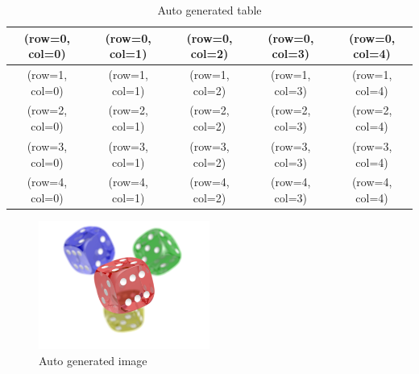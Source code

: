 \documentclass[a4paper,11pt]{article}
\begin{document}
\begin{table}
\caption{Auto generated table}
\centering
\begin{tabular}{|c|c|c|c|c|}

\hline
(row=0, col=0) & (row=0, col=1) & (row=0, col=2) & (row=0, col=3) & (row=0, col=4) \\
\hline
(row=1, col=0) & (row=1, col=1) & (row=1, col=2) & (row=1, col=3) & (row=1, col=4) \\
\hline
(row=2, col=0) & (row=2, col=1) & (row=2, col=2) & (row=2, col=3) & (row=2, col=4) \\
\hline
(row=3, col=0) & (row=3, col=1) & (row=3, col=2) & (row=3, col=3) & (row=3, col=4) \\
\hline
(row=4, col=0) & (row=4, col=1) & (row=4, col=2) & (row=4, col=3) & (row=4, col=4) \\
\hline

\end{tabular}
\end{table}

\begin{figure}
\caption{Auto generated image}
\centering
\includegraphics[width=0.5\textwidth]{"../../PNG_transparency_demonstration_1.png"}
\end{figure}
\end{document}

